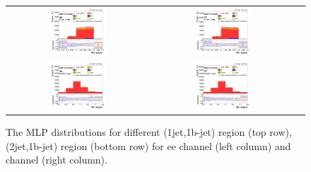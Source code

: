 \begin{figure}[ht]
  \begin{center}
    \begin{tabular}{ccc}
      \includegraphics[width=0.4\textwidth]{figures/tW/fig/tW_result/Result/ee/H_MLP_1jet_1bjet.png} &
      \includegraphics[width=0.4\textwidth]{figures/tW/fig/tW_result/Result/mumu/H_MLP_1jet_1bjet.png}\\
      \includegraphics[width=0.4\textwidth]{figures/tW/fig/tW_result/Result/ee/H_MLP_2jet_1bjet.png} &
      \includegraphics[width=0.4\textwidth]{figures/tW/fig/tW_result/Result/mumu/H_MLP_2jet_1bjet.png}\\
    \end{tabular}
    \caption{The MLP distributions for different (1jet,1b-jet)  region (top row), (2jet,1b-jet) region (bottom row) for ee channel (left column) and \mumu channel (right column).
    \label{fig:limit_MLP}}
  \end{center}
\end{figure}

